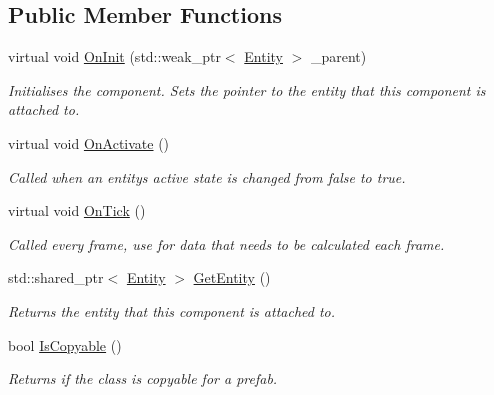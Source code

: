 \subsection*{Public Member Functions}
\begin{DoxyCompactItemize}
\item 
virtual void \hyperlink{classfrontier_1_1_component_af3da02905c4d79219d9b12f260a35ad1}{On\+Init} (std\+::weak\+\_\+ptr$<$ \hyperlink{classfrontier_1_1_entity}{Entity} $>$ \+\_\+parent)
\begin{DoxyCompactList}\small\item\em Initialises the component. Sets the pointer to the entity that this component is attached to. \end{DoxyCompactList}\item 
virtual void \hyperlink{classfrontier_1_1_component_a77fca7ba1960aafb9bc05905e300c79d}{On\+Activate} ()
\begin{DoxyCompactList}\small\item\em Called when an entity\textquotesingle{}s active state is changed from false to true. \end{DoxyCompactList}\item 
virtual void \hyperlink{classfrontier_1_1_component_ab920f9bc07ce051ebb5559c5a66508d1}{On\+Tick} ()
\begin{DoxyCompactList}\small\item\em Called every frame, use for data that needs to be calculated each frame. \end{DoxyCompactList}\item 
std\+::shared\+\_\+ptr$<$ \hyperlink{classfrontier_1_1_entity}{Entity} $>$ \hyperlink{classfrontier_1_1_component_a4d4193dbf06629b5e457fb8f7d460e49}{Get\+Entity} ()
\begin{DoxyCompactList}\small\item\em Returns the entity that this component is attached to. \end{DoxyCompactList}\item 
bool \hyperlink{classfrontier_1_1_component_a22a2ac83f030cd83415a51f584cf2d32}{Is\+Copyable} ()
\begin{DoxyCompactList}\small\item\em Returns if the class is copyable for a prefab. \end{DoxyCompactList}\end{DoxyCompactItemize}
